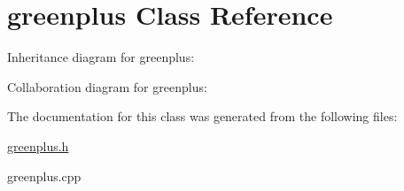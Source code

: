 \hypertarget{classgreenplus}{}\section{greenplus Class Reference}
\label{classgreenplus}


Inheritance diagram for greenplus\+:


Collaboration diagram for greenplus\+:


The documentation for this class was generated from the following files\+:\begin{DoxyCompactItemize}
\item 
\hyperlink{greenplus_8h}{greenplus.\+h}\item 
greenplus.\+cpp\end{DoxyCompactItemize}
